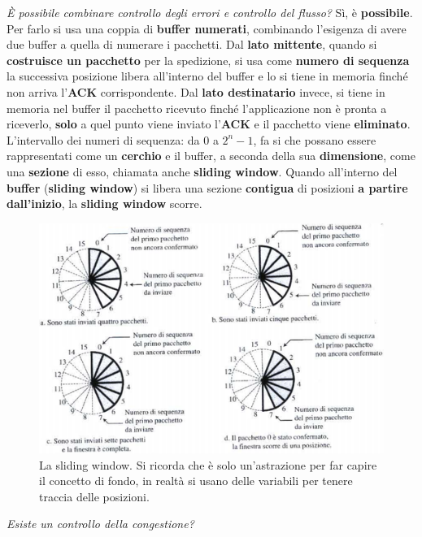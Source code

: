 \documentclass[11pt,a4paper]{article}
\theoremstyle{definition}
\begin{document}
\newpage
\textit{È possibile combinare controllo degli errori e controllo del flusso?}\newline\newline
Sì, è \textbf{possibile}. Per farlo si usa una coppia di \textbf{buffer numerati}, combinando l'esigenza di avere due buffer a quella di numerare i pacchetti.
Dal \textbf{lato mittente}, quando si \textbf{costruisce un pacchetto} per la spedizione, si usa come \textbf{numero di sequenza} la successiva posizione libera all'interno del buffer e lo si tiene in memoria finché non arriva l'\textbf{ACK} corrispondente. Dal \textbf{lato destinatario} invece, si tiene in memoria nel buffer il pacchetto ricevuto finché l'applicazione non è pronta a riceverlo, \textbf{solo} a quel punto viene inviato l'\textbf{ACK} e il pacchetto viene \textbf{eliminato}. L'intervallo dei numeri di sequenza: da 0 a $2^n - 1$, fa si che possano essere rappresentati come un \textbf{cerchio} e il buffer, a seconda della sua \textbf{dimensione}, come una \textbf{sezione} di esso, chiamata anche \textbf{sliding window}. Quando all'interno del \textbf{buffer} (\textbf{sliding window}) si libera una sezione \textbf{contigua} di posizioni \textbf{a partire dall'inizio}, la \textbf{sliding window} scorre.
\begin{figure}[!h]
	\includegraphics[scale=0.75]{Immagini/Sliding_w.png}
	\centering
	\caption{La sliding window. Si ricorda che è solo un'astrazione per far capire il concetto di fondo, in realtà si usano delle variabili per tenere traccia delle posizioni.}
\end{figure}\newline
\textit{Esiste un controllo della congestione?}\newline\newline
\end{document}
